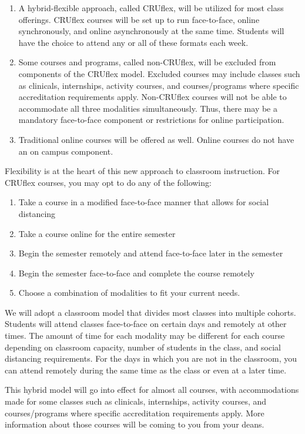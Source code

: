 \documentclass[
]{article}
\begin{document}
\begin{enumerate}
\item A hybrid-flexible approach, called CRUflex, will be utilized for most class offerings. CRUflex courses will be set up to run face-to-face, online synchronously, and online asynchronously at the same time. Students will have the choice to attend any or all of these formats each week.
\item Some courses and programs, called non-CRUflex, will be excluded from components of the CRUflex model. Excluded courses may include classes such as clinicals, internships, activity courses, and courses/programs where specific accreditation requirements apply. Non-CRUflex courses will not be able to accommodate all three modalities simultaneously. Thus, there may be a mandatory face-to-face component or restrictions for online participation.
\item Traditional online courses will be offered as well. Online courses do not have an on campus component.
\end{enumerate}

Flexibility is at the heart of this new approach to classroom
instruction. For CRUflex courses, you may opt to do any of the
following:

\begin{enumerate} 
\item Take a course in a modified face-to-face manner that allows for social distancing
\item Take a course online for the entire semester 
\item Begin the semester remotely and attend face-to-face later in the semester
\item Begin the semester face-to-face and complete the course remotely
\item Choose a combination of modalities to fit your current needs.
\end{enumerate}

We will adopt a classroom model that divides most classes into multiple
cohorts. Students will attend classes face-to-face on certain days and
remotely at other times. The amount of time for each modality may be
different for each course depending on classroom capacity, number of
students in the class, and social distancing requirements. For the days
in which you are not in the classroom, you can attend remotely during
the same time as the class or even at a later time.

This hybrid model will go into effect for almost all courses, with
accommodations made for some classes such as clinicals, internships,
activity courses, and courses/programs where specific accreditation
requirements apply. More information about those courses will be coming
to you from your deans.
\end{document}
